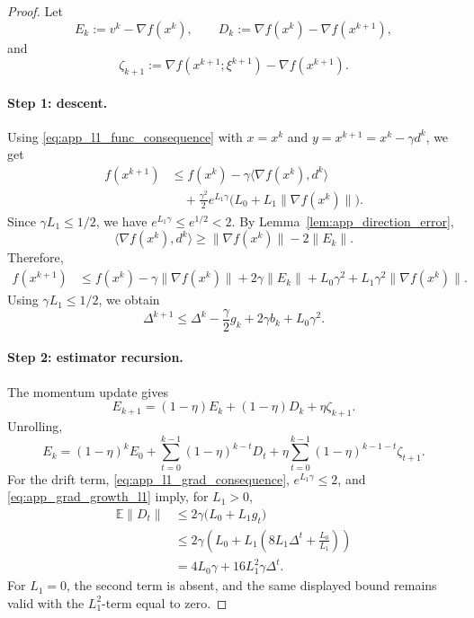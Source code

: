 \documentclass[letter,11pt]{article}
\newcommand{\E}{\mathbb{E}}
\begin{document}
\begin{proof}
Let
\[
    E_k:=v^k-\nabla f(x^k),
    \qquad
    D_k:=\nabla f(x^k)-\nabla f(x^{k+1}),
\]
and
\[
    \zeta_{k+1}
    :=
    \nabla f(x^{k+1};\xi^{k+1})-\nabla f(x^{k+1}).
\]

\paragraph{Step 1: descent.}
Using \eqref{eq:app_l1_func_consequence} with
\(x=x^k\) and \(y=x^{k+1}=x^k-\gamma d^k\), we get
\[
\begin{aligned}
    f(x^{k+1})
    &\le
    f(x^k)-\gamma\langle\nabla f(x^k),d^k\rangle \\
    &\quad
    +\frac{\gamma^2}{2}e^{L_1\gamma}
    \bigl(L_0+L_1\|\nabla f(x^k)\|\bigr).
\end{aligned}
\]
Since \(\gamma L_1\le 1/2\), we have \(e^{L_1\gamma}\le e^{1/2}<2\).
By Lemma~\ref{lem:app_direction_error},
\[
    \langle\nabla f(x^k),d^k\rangle
    \ge
    \|\nabla f(x^k)\|-2\|E_k\|.
\]
Therefore,
\[
\begin{aligned}
    f(x^{k+1})
    &\le
    f(x^k)
    -\gamma\|\nabla f(x^k)\|
    +2\gamma\|E_k\|
    +L_0\gamma^2
    +L_1\gamma^2\|\nabla f(x^k)\|.
\end{aligned}
\]
Using \(\gamma L_1\le1/2\), we obtain
\begin{equation}
\label{eq:app_l1_descent_recursion}
    \Delta^{k+1}
    \le
    \Delta^k-\frac{\gamma}{2}g_k+2\gamma b_k+L_0\gamma^2.
\end{equation}

\paragraph{Step 2: estimator recursion.}
The momentum update gives
\[
    E_{k+1}
    =
    (1-\eta)E_k+(1-\eta)D_k+\eta\zeta_{k+1}.
\]
Unrolling,
\[
    E_k
    =
    (1-\eta)^kE_0
    +\sum_{t=0}^{k-1}(1-\eta)^{k-t}D_t
    +\eta\sum_{t=0}^{k-1}(1-\eta)^{k-1-t}\zeta_{t+1}.
\]
For the drift term, \eqref{eq:app_l1_grad_consequence},
\(e^{L_1\gamma}\le2\), and \eqref{eq:app_grad_growth_l1} imply, for
\(L_1>0\),
\[
\begin{aligned}
    \E\|D_t\|
    &\le
    2\gamma\bigl(L_0+L_1g_t\bigr) \\
    &\le
    2\gamma\left(L_0+L_1
    \left(8L_1\Delta^t+\frac{L_0}{L_1}\right)\right) \\
    &=
    4L_0\gamma+16L_1^2\gamma\Delta^t.
\end{aligned}
\]
For \(L_1=0\), the second term is absent, and the same displayed bound remains
valid with the \(L_1^2\)-term equal to zero.


\end{proof}
\end{document}
